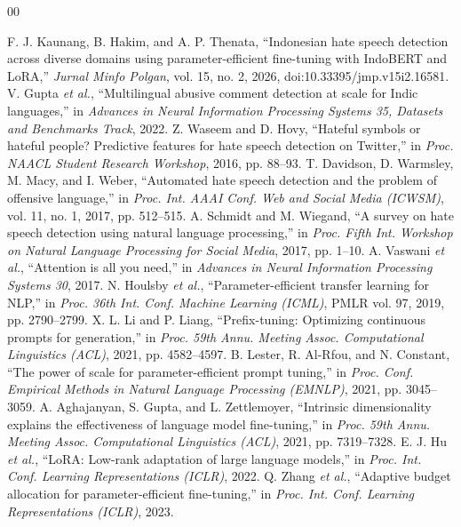 \documentclass{svproc}
\begin{document}
%
%
\begin{thebibliography}{00}
%

 F. J. Kaunang, B. Hakim, and A. P. Thenata, ``Indonesian hate speech detection across diverse domains using parameter-efficient fine-tuning with IndoBERT and LoRA,'' \textit{Jurnal Minfo Polgan}, vol. 15, no. 2, 2026, doi:10.33395/jmp.v15i2.16581.
 V. Gupta \textit{et al.}, ``Multilingual abusive comment detection at scale for Indic languages,'' in \textit{Advances in Neural Information Processing Systems 35, Datasets and Benchmarks Track}, 2022.
 Z. Waseem and D. Hovy, ``Hateful symbols or hateful people? Predictive features for hate speech detection on Twitter,'' in \textit{Proc. NAACL Student Research Workshop}, 2016, pp. 88--93.
 T. Davidson, D. Warmsley, M. Macy, and I. Weber, ``Automated hate speech detection and the problem of offensive language,'' in \textit{Proc. Int. AAAI Conf. Web and Social Media (ICWSM)}, vol. 11, no. 1, 2017, pp. 512--515.
 A. Schmidt and M. Wiegand, ``A survey on hate speech detection using natural language processing,'' in \textit{Proc. Fifth Int. Workshop on Natural Language Processing for Social Media}, 2017, pp. 1--10.
 A. Vaswani \textit{et al.}, ``Attention is all you need,'' in \textit{Advances in Neural Information Processing Systems 30}, 2017.
 N. Houlsby \textit{et al.}, ``Parameter-efficient transfer learning for NLP,'' in \textit{Proc. 36th Int. Conf. Machine Learning (ICML)}, PMLR vol. 97, 2019, pp. 2790--2799.
 X. L. Li and P. Liang, ``Prefix-tuning: Optimizing continuous prompts for generation,'' in \textit{Proc. 59th Annu. Meeting Assoc. Computational Linguistics (ACL)}, 2021, pp. 4582--4597.
 B. Lester, R. Al-Rfou, and N. Constant, ``The power of scale for parameter-efficient prompt tuning,'' in \textit{Proc. Conf. Empirical Methods in Natural Language Processing (EMNLP)}, 2021, pp. 3045--3059.
 A. Aghajanyan, S. Gupta, and L. Zettlemoyer, ``Intrinsic dimensionality explains the effectiveness of language model fine-tuning,'' in \textit{Proc. 59th Annu. Meeting Assoc. Computational Linguistics (ACL)}, 2021, pp. 7319--7328.
 E. J. Hu \textit{et al.}, ``LoRA: Low-rank adaptation of large language models,'' in \textit{Proc. Int. Conf. Learning Representations (ICLR)}, 2022.
 Q. Zhang \textit{et al.}, ``Adaptive budget allocation for parameter-efficient fine-tuning,'' in \textit{Proc. Int. Conf. Learning Representations (ICLR)}, 2023.

\end{thebibliography}
\end{document}
